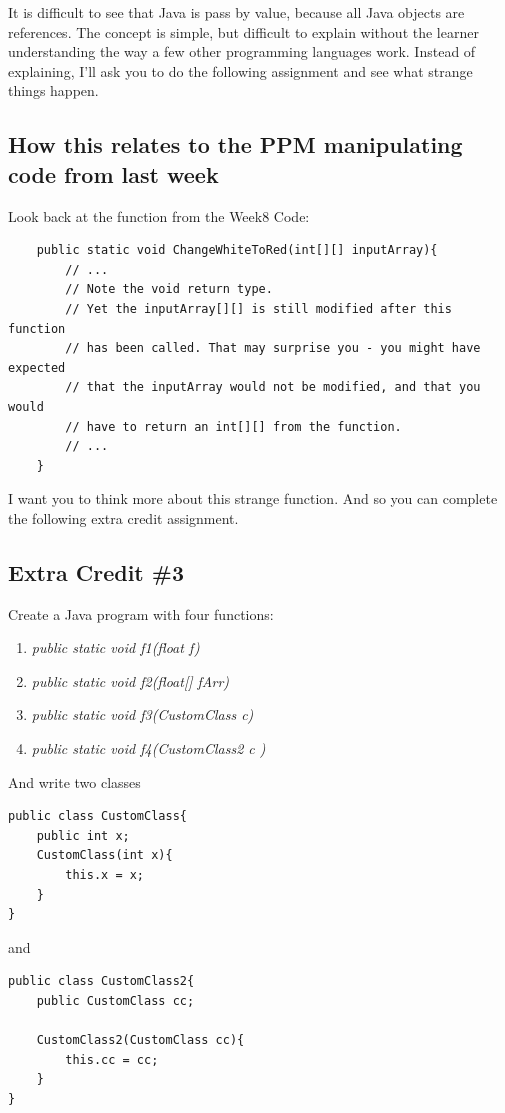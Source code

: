 \documentclass[12pt]{article}
\begin{document}
It is difficult to see that Java is pass by value, because all Java objects are references. The concept is simple, but difficult to explain without the learner understanding the way a few other programming languages work. Instead of explaining, I'll ask you to do the following assignment and see what strange things happen.

\subsection{How this relates to the PPM manipulating code from last week}
Look back at the function from the Week8 Code:

\begin{lstlisting}
	public static void ChangeWhiteToRed(int[][] inputArray){
		// ...
		// Note the void return type. 
		// Yet the inputArray[][] is still modified after this function
		// has been called. That may surprise you - you might have expected
		// that the inputArray would not be modified, and that you would
		// have to return an int[][] from the function. 
		// ...
	}
\end{lstlisting}

I want you to think more about this strange function. And so you can complete the following extra credit assignment.

\subsection{Extra Credit \#3}
Create a Java program with four functions:

\begin{enumerate}
\item \textit{public static void f1(float f)}
\item \textit{public static void f2(float[] fArr)}
\item \textit{public static void f3(CustomClass c)}
\item \textit{public static void f4(CustomClass2 c )}
\end{enumerate}

And write two classes

\begin{lstlisting}
public class CustomClass{
	public int x;
	CustomClass(int x){
		this.x = x;
	}	
}
\end{lstlisting}

and

\begin{lstlisting}
public class CustomClass2{
	public CustomClass cc;

	CustomClass2(CustomClass cc){
		this.cc = cc;
	}
}
\end{lstlisting}
\end{document}
